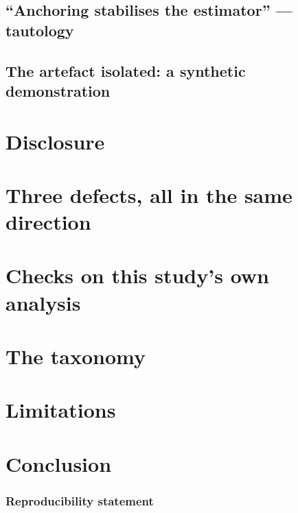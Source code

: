 \documentclass[11pt]{article}
\begin{document}
\subsection{``Anchoring stabilises the estimator'' --- tautology}\label{sec:tautology}


\subsection{The artefact isolated: a synthetic demonstration}\label{sec:synthetic}


\section{Disclosure}\label{sec:disclosure}


\section{Three defects, all in the same direction}\label{sec:defects}


\section{Checks on this study's own analysis}\label{sec:checks}


\section{The taxonomy}\label{sec:taxonomy}


\section{Limitations}\label{sec:limitations}


\section{Conclusion}\label{sec:conclusion}


\subsubsection*{Reproducibility statement}

\end{document}
